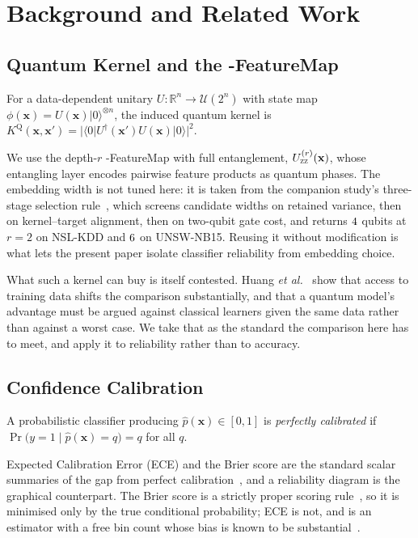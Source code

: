 \documentclass[journal]{IEEEtran}
\begin{document}
\section{Background and Related Work}\label{sec:related}

\subsection{Quantum Kernel and the \ZZ{}-FeatureMap}
\begin{definition}
For a data-dependent unitary $U:\mathbb{R}^n\!\to\!\mathcal{U}(2^n)$ with
state map $\phi(\mathbf{x})=U(\mathbf{x})|0\rangle^{\otimes n}$, the
induced quantum kernel is
$K^{\mathrm{Q}}(\mathbf{x},\mathbf{x}')=
|\langle 0|U^{\dagger}(\mathbf{x}')U(\mathbf{x})|0\rangle|^2$.
\end{definition}
We use the depth-$r$ \ZZ{}-FeatureMap with full entanglement,
$U^{(r)}_{\textsc{zz}}(\mathbf{x})$, whose entangling layer encodes pairwise
feature products as quantum phases. The embedding width is not tuned here:
it is taken from the companion study's three-stage selection
rule~\cite{companion}, which screens candidate widths on retained variance,
then on kernel--target alignment, then on two-qubit gate cost, and returns
$4$ qubits at $r{=}2$ on NSL-KDD and $6$ on
UNSW-NB15. Reusing it without modification is what lets the present paper
isolate classifier reliability from embedding choice.

What such a kernel can buy is itself contested. Huang \emph{et
al.}~\cite{huang2021power} show that access to training data shifts the
comparison substantially, and that a quantum model's advantage must be
argued against classical learners given the same data rather than against a
worst case. We take that as the standard the comparison here has to meet,
and apply it to reliability rather than to accuracy.

\subsection{Confidence Calibration}
\begin{definition}[Calibration]
A probabilistic classifier producing $\hat{p}(\mathbf{x})\in[0,1]$ is
\emph{perfectly calibrated} if
$\Pr\!\big(y{=}1\mid\hat{p}(\mathbf{x}){=}q\big)=q$ for all $q$.
\end{definition}
Expected Calibration Error (ECE) and the Brier score are the standard
scalar summaries of the gap from perfect
calibration~\cite{naeini2015ece,brier1950}, and a reliability diagram is
the graphical counterpart. The Brier score is a strictly proper scoring
rule~\cite{gneiting2007scoring}, so it is minimised only by the true
conditional probability; ECE is not, and is an estimator with a free bin
count whose bias is known to be substantial~\cite{kumar2019verified}.
\end{document}
